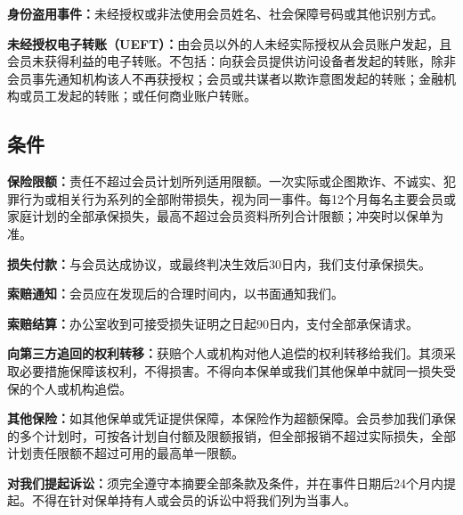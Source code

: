 \documentclass[UTF8,fontset=none,11pt,a4paper]{ctexart}
\begin{document}
\textbf{身份盗用事件：}未经授权或非法使用会员姓名、社会保障号码或其他识别方式。


\textbf{未经授权电子转账（UEFT）：}由会员以外的人未经实际授权从会员账户发起，且会员未获得利益的电子转账。不包括：向获会员提供访问设备者发起的转账，除非会员事先通知机构该人不再获授权；会员或共谋者以欺诈意图发起的转账；金融机构或员工发起的转账；或任何商业账户转账。


\subsection*{条件}
\textbf{保险限额：}责任不超过会员计划所列适用限额。一次实际或企图欺诈、不诚实、犯罪行为或相关行为系列的全部附带损失，视为同一事件。每12个月每名主要会员或家庭计划的全部承保损失，最高不超过会员资料所列合计限额；冲突时以保单为准。


\textbf{损失付款：}与会员达成协议，或最终判决生效后30日内，我们支付承保损失。


\textbf{索赔通知：}会员应在发现后的合理时间内，以书面通知我们。


\textbf{索赔结算：}办公室收到可接受损失证明之日起90日内，支付全部承保请求。


\textbf{向第三方追回的权利转移：}获赔个人或机构对他人追偿的权利转移给我们。其须采取必要措施保障该权利，不得损害。不得向本保单或我们其他保单中就同一损失受保的个人或机构追偿。


\textbf{其他保险：}如其他保单或凭证提供保障，本保险作为超额保障。会员参加我们承保的多个计划时，可按各计划自付额及限额报销，但全部报销不超过实际损失，全部计划责任限额不超过可用的最高单一限额。


\textbf{对我们提起诉讼：}须完全遵守本摘要全部条款及条件，并在事件日期后24个月内提起。不得在针对保单持有人或会员的诉讼中将我们列为当事人。
\end{document}
